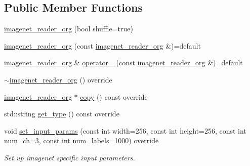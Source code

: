 \subsection*{Public Member Functions}
\begin{DoxyCompactItemize}
\item 
\hyperlink{classlbann_1_1imagenet__reader__org_a77d88b53b26f903855da22e5d77ef06a}{imagenet\+\_\+reader\+\_\+org} (bool shuffle=true)
\item 
\hyperlink{classlbann_1_1imagenet__reader__org_acb398613b049223104df1c708483da80}{imagenet\+\_\+reader\+\_\+org} (const \hyperlink{classlbann_1_1imagenet__reader__org}{imagenet\+\_\+reader\+\_\+org} \&)=default
\item 
\hyperlink{classlbann_1_1imagenet__reader__org}{imagenet\+\_\+reader\+\_\+org} \& \hyperlink{classlbann_1_1imagenet__reader__org_ab0f8949275ef71ef3f9d9bdb617440c4}{operator=} (const \hyperlink{classlbann_1_1imagenet__reader__org}{imagenet\+\_\+reader\+\_\+org} \&)=default
\item 
\hyperlink{classlbann_1_1imagenet__reader__org_a75217107dd22b4cc39b367a4d7f2a003}{$\sim$imagenet\+\_\+reader\+\_\+org} () override
\item 
\hyperlink{classlbann_1_1imagenet__reader__org}{imagenet\+\_\+reader\+\_\+org} $\ast$ \hyperlink{classlbann_1_1imagenet__reader__org_ab13b41829be269110dfe74082918c349}{copy} () const override
\item 
std\+::string \hyperlink{classlbann_1_1imagenet__reader__org_ade6e7e9bc1a3f9562c0f274a3d665e0a}{get\+\_\+type} () const override
\item 
void \hyperlink{classlbann_1_1imagenet__reader__org_afb843084789c6a12e01a5d4a687003cf}{set\+\_\+input\+\_\+params} (const int width=256, const int height=256, const int num\+\_\+ch=3, const int num\+\_\+labels=1000) override
\begin{DoxyCompactList}\small\item\em Set up imagenet specific input parameters. \end{DoxyCompactList}\end{DoxyCompactItemize}
